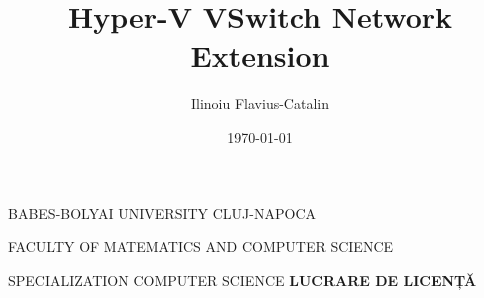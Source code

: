\begin{center}
\Large{BABES-BOLYAI UNIVERSITY CLUJ-NAPOCA} 

\Large{FACULTY OF MATEMATICS AND COMPUTER SCIENCE}

\Large{SPECIALIZATION COMPUTER SCIENCE}
\vspace{3.5cm}
\Large \textbf{LUCRARE DE LICENȚĂ}
\vspace{3.5cm}
\title{Hyper-V VSwitch Network Extension}
\author{Ilinoiu Flavius-Catalin}
\date{\today}
\maketitle

\end{center}